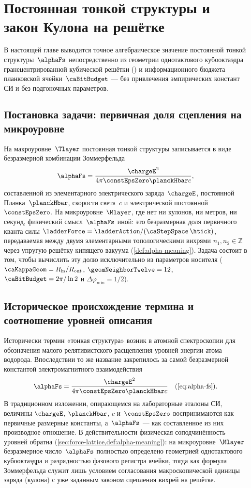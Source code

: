 \chapter{Постоянная тонкой структуры и закон Кулона на решётке}
\label{ch:alpha}

В настоящей главе выводится точное алгебраическое значение постоянной тонкой структуры~$\alphaFs$
непосредственно из геометрии однотактового кубооктаэдра гранецентрированной кубической решётки (\latGCKshort)
и информационного бюджета планковской ячейки~$\caBitBudget$ --- без привлечения эмпирических констант СИ и без подгоночных параметров.

\section{Постановка задачи: первичная доля сцепления на микроуровне}

На макроуровне~$\Tlayer$ постоянная тонкой структуры записывается в виде безразмерной комбинации Зоммерфельда
\[
  \alphaFs = \frac{\chargeE^2}{4\pi\constEpsZero\planckHbar c},
\]
составленной из элементарного электрического заряда~$\chargeE$, постоянной Планка~$\planckHbar$, скорости света~$c$ и электрической постоянной~$\constEpsZero$.
На микроуровне~$\Mlayer$, где нет ни кулонов, ни метров, ни секунд, физический смысл~$\alphaFs$ иной:
это безразмерная доля первичного кванта силы $\ladderForce = \ladderAction/(\caStepSpace\,\htick)$,
передаваемая между двумя элементарными топологическими вихрями $n_1,n_2\in\mathbb{Z}$ через упругую решётку кипящего вакуума (\cref{def:alpha-meaning}).
Задача состоит в том, чтобы вычислить эту долю исключительно из параметров носителя ($\caKappaGeom = R_{\mathrm{in}}/R_{\mathrm{out}}$, $\geomNeighborTwelve = 12$, $\caBitBudget = 2\pi/\ln 2$ и $\Delta\varphi_{\min} = 1/2$).

\section{Историческое происхождение термина и соотношение уровней описания}
\label{sec:alpha-name}

Исторически термин «тонкая структура» возник в атомной спектроскопии для обозначения малого релятивистского расщепления уровней энергии атома водорода.
Впоследствии то же название закрепилось за самой безразмерной константой электромагнитного взаимодействия
\[
  \alphaFs = \frac{\chargeE^2}{4\pi\constEpsZero\planckHbar c}
  \quad\text{(\cref{eq:alpha-fs}).}
\]
В традиционном изложении, опирающемся на лабораторные эталоны СИ, величины $\chargeE$, $\planckHbar$, $c$ и~$\constEpsZero$ воспринимаются как первичные размерные константы, а~$\alphaFs$ --- как составленное из них производное отношение.
В действительности физическая соподчинённость уровней обратна (\cref{sec:force-lattice,def:alpha-meaning}):
на микроуровне~$\Mlayer$ безразмерное число~$\alphaFs$ полностью определено геометрией однотактового кубооктаэдра и разрядностью фазового регистра ячейки,
тогда как формула Зоммерфельда служит лишь условием согласования макроскопической единицы заряда (кулона) с уже заданным законом сцепления вихрей на решётке.

